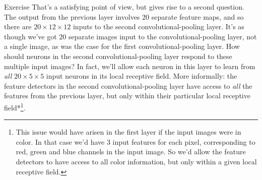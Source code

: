\begin{exerciseBox}{Exercise}
That's a satisfying point of view, but gives rise to a second question. The output from the previous layer involves $20$ separate feature maps, and so there are $20 \times 12 \times 12$ inputs to the second convolutional-pooling layer. It's as though we've got $20$ separate images input to the convolutional-pooling layer, not a single image, as was the case for the first convolutional-pooling layer. How should neurons in the second convolutional-pooling layer respond to these multiple input images? In fact, we'll allow each neuron in this layer to learn from \emph{all} $20 \times 5 \times 5$ input neurons in its local receptive field. More informally: the feature detectors in the second convolutional-pooling layer have access to \emph{all} the features from the previous layer, but only within their particular local receptive field*\footnote{This issue would have arisen in the first layer if the input images were in color. In that case we'd have 3 input features for each pixel, corresponding to red, green and blue channels in the input image. So we'd allow the feature detectors to have access to all color information, but only within a given local receptive field.}.

\end{exerciseBox}



